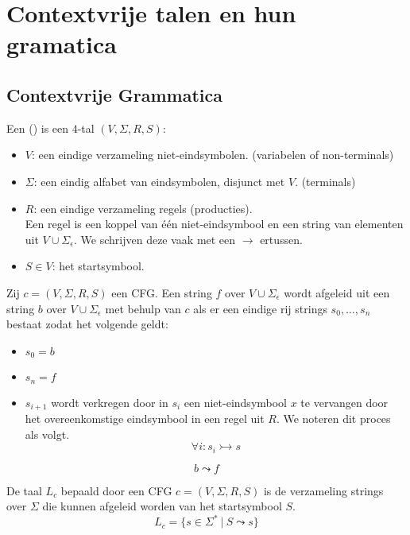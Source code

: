 \documentclass[main.tex]{subfiles}
\begin{document}
\chapter{Contextvrije talen en hun gramatica}
\label{cha:contextvrije-talen}

\section{Contextvrije Grammatica}
\label{sec:contextvrije-grammatica}


\begin{de}
  Een  () is een $4$-tal $(V,\Sigma,R,S)$:
  \begin{itemize}
  \item $V$: een eindige verzameling niet-eindsymbolen. (variabelen of non-terminals)
  \item $\Sigma$: een eindig alfabet van eindsymbolen, disjunct met $V$. (terminals)
  \item $R$: een eindige verzameling regels (producties).\\
    Een regel is een koppel van \'e\'en niet-eindsymbool en een string van elementen uit $V \cup \Sigma_{\epsilon}$. We schrijven deze vaak met een $\rightarrow$ ertussen.
  \item $S\in V$: het startsymbool.
  \end{itemize}
\end{de}

\begin{de}
  Zij $c = (V,\Sigma,R,S)$ een CFG.
  Een string $f$ over $V \cup \Sigma_{\epsilon}$ wordt afgeleid uit een string $b$ over $V \cup \Sigma_{\epsilon}$ met behulp van $c$ als er een eindige rij strings $s_{0},\dotsc,s_{n}$ bestaat zodat het volgende geldt:
  \begin{itemize}
  \item $s_{0} = b$
  \item $s_{n} = f$
  \item $s_{i+1}$ wordt verkregen door in $s_{i}$ een niet-eindsymbool $x$ te vervangen door het overeenkomstige eindsymbool in een regel uit $R$.
    We noteren dit proces als volgt.
    \[ \forall i: s_{i} \rightarrowtail s \]
  \end{itemize}
  \[ b \leadsto f \]
\end{de}

\begin{de}
  De taal $L_{c}$ bepaald door een CFG $c = (V,\Sigma,R,S)$ is de verzameling strings over $\Sigma$ die kunnen afgeleid worden van het startsymbool $S$.
  \[ L_{c} = \{ s \in \Sigma^{*}\ |\ S \leadsto s \}
\]
\end{de}
\end{document}
